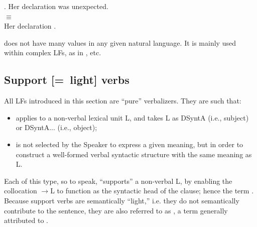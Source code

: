 \begingroup
\small

\ex. Her declaration was unexpected.\\
     $\equiv$ \\
     Her declaration .

\endgroup

 does not have many values in any given natural language. It is mainly used within complex LFs, as in , etc.


\subsection{Support [=~light] verbs}\label{sec:verbeSupport}

All LFs  introduced in this section are ``pure'' verbalizers. They are such that:

\begin{itemize}

\item {} applies to a non-verbal lexical unit L, and  takes L as DSyntA\thinspace{} (i.e., subject) or DSyntA\thinspace{}\slashs{}\slashs... (i.e., object);

\item {} is not selected by the Speaker to express a given meaning, but in order to construct a well-formed verbal syntactic structure with the same meaning as L.

\end{itemize}

Each  of this type, so to speak, ``supports'' a non-verbal L, by enabling the collocation \thinspace$\rightarrow$\thinspace{}L to function as the syntactic head of the clause; hence the term  \parencite{GrossM1981}. Because support verbs are semantically ``light,'' i.e. they do not semantically contribute to the sentence, they are also referred to as , a term generally attributed to \textcite[Ch.~VII, \S{}]{Jespersen1946}.%

